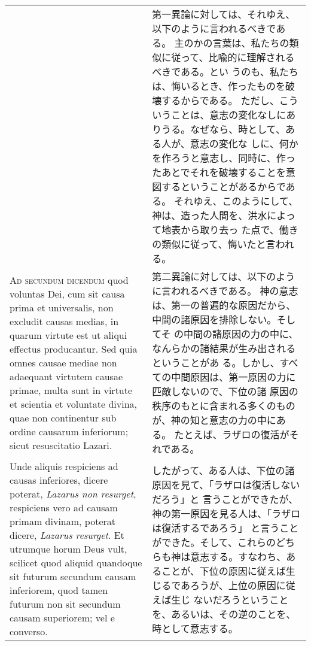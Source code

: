 \documentclass[10pt]{jsarticle} %
\begin{document}
\begin{longtable}{p{21em}p{21em}}
&

第一異論に対しては、それゆえ、以下のように言われるべきである。
主のかの言葉は、私たちの類似に従って、比喩的に理解されるべきである。とい
 うのも、私たちは、悔いるとき、作ったものを破壊するからである。
ただし、こういうことは、意志の変化なしにありうる。なぜなら、時として、ある人が、意志の変化な
 しに、何かを作ろうと意志し、同時に、作ったあとでそれを破壊することを意
 図するということがあるからである。
それゆえ、このようにして、神は、造った人間を、洪水によって地表から取り去っ
 た点で、働きの類似に従って、悔いたと言われる。

\\



{\scshape Ad secundum dicendum} quod voluntas Dei, cum
 sit causa prima et universalis, non excludit causas medias, in quarum
 virtute est ut aliqui effectus producantur. Sed quia omnes causae
 mediae non adaequant virtutem causae primae, multa sunt in virtute et
 scientia et voluntate divina, quae non continentur sub ordine causarum
 inferiorum; sicut resuscitatio Lazari. 


&

第二異論に対しては、以下のように言われるべきである。
神の意志は、第一の普遍的な原因だから、中間の諸原因を排除しない。そしてそ
 の中間の諸原因の力の中に、なんらかの諸結果が生み出されるということがあ
 る。しかし、すべての中間原因は、第一原因の力に匹敵しないので、下位の諸
 原因の秩序のもとに含まれる多くのものが、神の知と意志の力の中にある。
たとえば、ラザロの復活がそれである。


\\



Unde aliquis respiciens ad
 causas inferiores, dicere poterat, {\itshape Lazarus non resurget}, respiciens
 vero ad causam primam divinam, poterat dicere, {\itshape Lazarus resurget}. Et
 utrumque horum Deus vult, scilicet quod aliquid quandoque sit futurum
 secundum causam inferiorem, quod tamen futurum non sit secundum causam
 superiorem; vel e converso. 



&

したがって、ある人は、下位の諸原因を見て、「ラザロは復活しないだろう」と
 言うことができたが、神の第一原因を見る人は、「ラザロは復活するであろう」
 と言うことができた。そして、これらのどちらも神は意志する。すなわち、あ
 ることが、下位の原因に従えば生じるであろうが、上位の原因に従えば生じ
 ないだろうということを、あるいは、その逆のことを、時として意志する。



\end{longtable}
\end{document}
